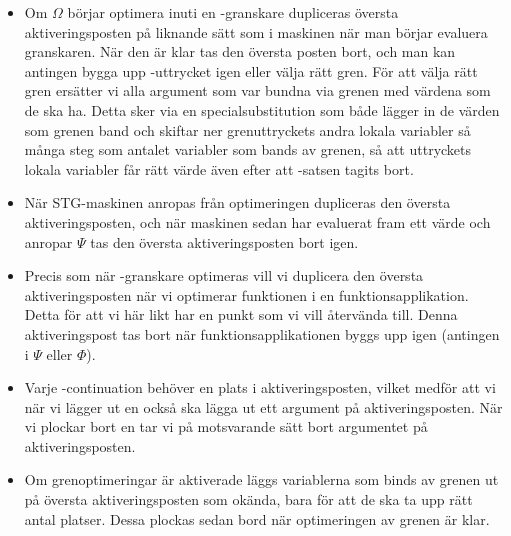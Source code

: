 \documentclass[../Optimise]{subfiles}
\begin{document}
\begin{itemize}
\item
Om $\Omega$ börjar optimera inuti en -granskare dupliceras översta aktiveringsposten 
på liknande sätt som i maskinen när man börjar evaluera granskaren. När den är klar
tas den översta posten bort, och man kan antingen bygga upp -uttrycket igen
eller välja rätt gren. För att välja rätt gren ersätter vi alla argument som var
bundna via grenen med värdena som de ska ha. Detta sker via en specialsubstitution 
som både lägger in de värden som grenen band och skiftar ner grenuttryckets andra lokala 
variabler så många steg som antalet variabler som bands av grenen, så att uttryckets
lokala variabler får rätt värde även efter att -satsen tagits bort.

\item
När STG-maskinen anropas från optimeringen dupliceras den översta aktiveringsposten,
och när maskinen sedan har evaluerat fram ett värde och anropar $\Psi$ tas den översta aktiveringsposten bort igen.

\item
Precis som när -granskare optimeras vill vi duplicera den översta aktiveringsposten när vi 
optimerar funktionen i en funktionsapplikation. Detta för att vi här likt 
har en punkt som vi vill återvända till. Denna aktiveringspost tas bort när 
funktionsapplikationen byggs upp igen (antingen i $\Psi$ eller $\Phi$). 

\item
Varje -continuation behöver en plats i aktiveringsposten, vilket medför
att vi när vi lägger ut en  också ska lägga ut ett argument på aktiveringsposten.
När vi plockar bort en  tar vi på motsvarande sätt bort argumentet på aktiveringsposten.

\item
Om grenoptimeringar är aktiverade läggs variablerna som binds av grenen ut på
översta aktiveringsposten som okända, bara för att de ska ta upp rätt antal platser.
Dessa plockas sedan bord när optimeringen av grenen är klar. 


\end{itemize}
\end{document}
